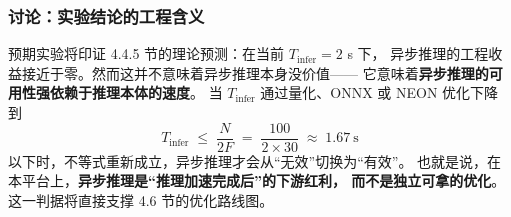 \subsubsection{讨论：实验结论的工程含义}\label{sec:async-exp-discussion}

预期实验将印证 4.4.5 节的理论预测：在当前 $T_{\text{infer}} = 2$ s 下，
异步推理的工程收益接近于零。然而这并不意味着异步推理本身没价值——
它意味着\textbf{异步推理的可用性强依赖于推理本体的速度}。
当 $T_{\text{infer}}$ 通过量化、ONNX 或 NEON 优化下降到
\begin{equation}
  T_{\text{infer}} \;\leq\; \frac{N}{2F} \;=\; \frac{100}{2 \times 30} \;\approx\; 1.67\ \text{s}
\end{equation}
以下时，不等式重新成立，异步推理才会从``无效''切换为``有效''。
也就是说，在本平台上，\textbf{异步推理是``推理加速完成后''的下游红利，
而不是独立可拿的优化}。这一判据将直接支撑 4.6 节的优化路线图。
